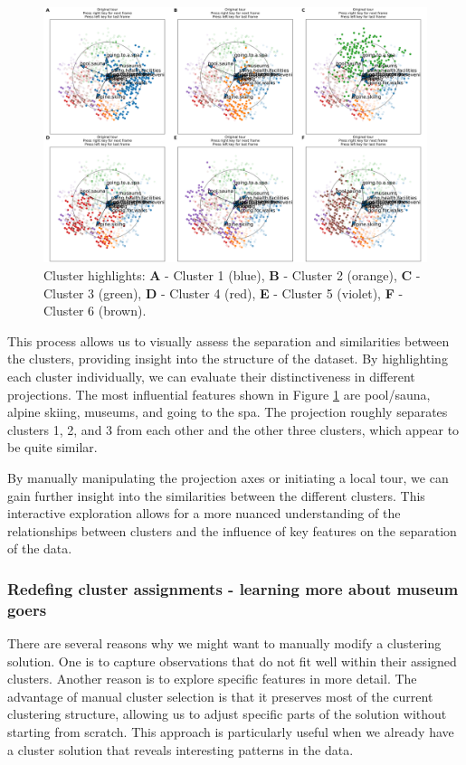 \documentclass[article]{ajs}
\begin{document}
\begin{figure}[h!]
    \centering
    \includegraphics[width=1\textwidth]{winter_activ_cluster_highlights.png}
    \caption{Cluster highlights: \textbf{A} - Cluster 1 (blue), \textbf{B} - Cluster 2 (orange), \textbf{C} - Cluster 3 (green), \textbf{D} - Cluster 4 (red), \textbf{E} - Cluster 5 (violet), \textbf{F} - Cluster 6 (brown).}
    \label{fig:winter_activ_cluster_highlights}
\end{figure}

This process allows us to visually assess the separation and similarities between the clusters, providing insight into the structure of the dataset. By highlighting each cluster individually, we can evaluate their distinctiveness in different projections. The most influential features shown in Figure \ref{fig:winter_activ_cluster_highlights} are pool/sauna, alpine skiing, museums, and going to the spa. The projection roughly separates clusters 1, 2, and 3 from each other and the other three clusters, which appear to be quite similar. 

By manually manipulating the projection axes or initiating a local tour, we can gain further insight into the similarities between the different clusters. This interactive exploration allows for a more nuanced understanding of the relationships between clusters and the influence of key features on the separation of the data.


\subsubsection{Redefing cluster assignments - learning more about museum goers}

There are several reasons why we might want to manually modify a clustering solution. One is to capture observations that do not fit well within their assigned clusters. Another reason is to explore specific features in more detail. The advantage of manual cluster selection is that it preserves most of the current clustering structure, allowing us to adjust specific parts of the solution without starting from scratch. This approach is particularly useful when we already have a cluster solution that reveals interesting patterns in the data.
\end{document}
